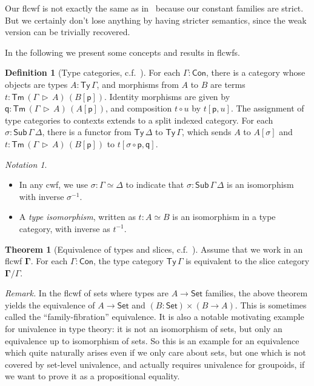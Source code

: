 \documentclass[12pt,a4paper,twoside,openany]{book}
\theoremstyle{remark}
\newtheorem{notation}{Notation}
\theoremstyle{definition}
\newtheorem{mydefinition}{Definition}
\theoremstyle{theorem}
\newtheorem{theorem}{Theorem}
\newcommand{\Con}{\mathsf{Con}}
\newcommand{\Sub}{\mathsf{Sub}}
\newcommand{\Tm}{\mathsf{Tm}}
\newcommand{\Ty}{\mathsf{Ty}}
\newcommand{\Set}{\mathsf{Set}}
\newcommand{\ext}{\triangleright}
\newcommand{\p}{\mathsf{p}}
\newcommand{\q}{\mathsf{q}}
\newcommand{\bGamma}{\boldsymbol{\Gamma}}
\begin{document}
Our flcwf is not exactly the same as in \cite{clairambault2014biequivalence}\,
because our constant families are strict. But we certainly don't lose anything
by having stricter semantics, since the weak version can be trivially
recovered.

In the following we present some concepts and results in flcwfs.

\begin{mydefinition}[Type categories, c.f.\ {\cite[Section 2.2]{clairambault2014biequivalence}}]
\label{def:type_categories} For each $\Gamma : \Con$, there is a category
whose objects are types $A : \Ty\,\Gamma$, and morphisms from $A$ to $B$ are
terms $t : \Tm\,(\Gamma\,\ext\,A)\,(B[\p])$. Identity morphisms are given by $\q
: \Tm\,(\Gamma\,\ext\,A)\,(A[\p])$, and composition $t \circ u$ by $t[\p,
  u]$. The assignment of type categories to contexts extends to a split indexed
category. For each $\sigma : \Sub\,\Gamma\,\Delta$, there is a functor from
$\Ty\,\Delta$ to $\Ty\,\Gamma$, which sends $A$ to $A[\sigma]$ and $t :
\Tm\,(\Gamma\,\ext\,A)\,(B[\p])$ to $t[\sigma\circ \p, \q]$.
\end{mydefinition}

\begin{notation}
  ~\\
  \begin{itemize}
  \item  \vspace{-1.7em}
         In any cwf, we use $\sigma : \Gamma \simeq \Delta$ to indicate
         that $\sigma : \Sub\,\Gamma\,\Delta$ is an isomorphism with inverse $\sigma^{-1}$.
    \item A \emph{type isomorphism}, written as $t : A \simeq B$ is an isomorphism in a
         type category, with inverse as $t^{-1}$.
  \end{itemize}
\end{notation}

\begin{theorem}[Equivalence of types and slices, c.f.\ {\cite[Section 2.2]{clairambault2014biequivalence}}]
Assume that we work in an flcwf $\bGamma$. For each $\Gamma : \Con$, the type
category $\Ty\,\Gamma$ is equivalent to the slice category $\bGamma/\Gamma$.
\end{theorem}

\emph{Remark.} In the flcwf of sets where types are $A \to \Set$ families, the
above theorem yields the equivalence of $A \to \Set$ and $(B : \Set) \times (B
\to A)$. This is sometimes called the ``family-fibration'' equivalence. It is
also a notable motivating example for univalence in type theory: it is not an
isomorphism of sets, but only an equivalence up to isomorphism of sets. So this
is an example for an equivalence which quite naturally arises even if we only
care about sets, but one which is not covered by set-level univalence, and
actually requires univalence for groupoids, if we want to prove it as a
propositional equality.
\end{document}
